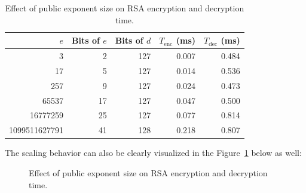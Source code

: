 \documentclass[11pt,a4paper]{article}
\begin{document}
\begin{table}[ht]
    \centering
    \caption{Effect of public exponent size on RSA encryption and decryption time.}
    \label{tab:public-exponent-scale}
    \begin{tabular}{rrrrr}
        \toprule
        $e$ & Bits of $e$ & Bits of $d$ &
        $T_{\mathrm{enc}}$ (ms) & $T_{\mathrm{dec}}$ (ms) \\
        \midrule
        3             & 2  & 127 & 0.007 & 0.484 \\
        17            & 5  & 127 & 0.014 & 0.536 \\
        257           & 9  & 127 & 0.024 & 0.473 \\
        65537         & 17 & 127 & 0.047 & 0.500 \\
        16777259      & 25 & 127 & 0.077 & 0.814 \\
        1099511627791 & 41 & 128 & 0.218 & 0.807 \\
        \bottomrule
    \end{tabular}
\end{table}

The scaling behavior can also be clearly visualized in the Figure~\ref{fig:public-exponent-time} below as well:
\begin{figure}[ht]
    \centering

    \caption{Effect of public exponent size on RSA encryption and decryption time.}
    \label{fig:public-exponent-time}
\end{figure}
\end{document}
